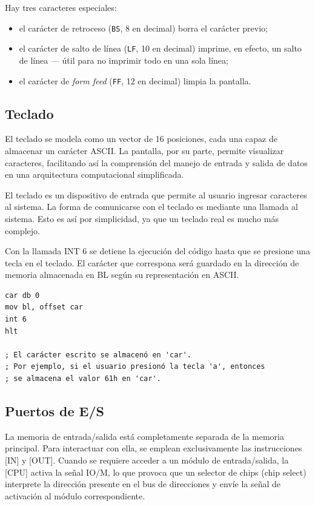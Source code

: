 \documentclass[12pt,oneside]{templates/unerthesis}
\providecommand{\tightlist}{%
  \setlength{\itemsep}{0pt}\setlength{\parskip}{0pt}}
\begin{document}
Hay tres caracteres especiales:

\begin{itemize}
\tightlist
\item
  el carácter de retroceso (\texttt{BS}, 8 en decimal) borra el carácter previo;
\item
  el carácter de salto de línea (\texttt{LF}, 10 en decimal) imprime, en efecto, un salto de línea --- útil para no imprimir todo en una sola línea;
\item
  el carácter de \emph{form feed} (\texttt{FF}, 12 en decimal) limpia la pantalla.
\end{itemize}

\hypertarget{teclado}{%
\subsection{Teclado}\label{teclado}}

El teclado se modela como un vector de 16 posiciones, cada una capaz de almacenar un carácter ASCII. La pantalla, por su parte, permite visualizar caracteres, facilitando así la comprensión del manejo de entrada y salida de datos en una arquitectura computacional simplificada.

El teclado es un dispositivo de entrada que permite al usuario ingresar caracteres al sistema. La forma de comunicarse con el teclado es mediante una llamada al sistema. Esto es así por simplicidad, ya que un teclado real es mucho más complejo.

Con la llamada INT 6 se detiene la ejecución del código hasta que se presione una tecla en el teclado. El carácter que correspona será guardado en la dirección de memoria almacenada en BL según su representación en ASCII.

\begin{lstlisting}
car db 0
mov bl, offset car
int 6
hlt

; El carácter escrito se almacenó en 'car'.
; Por ejemplo, si el usuario presionó la tecla 'a', entonces
; se almacena el valor 61h en 'car'.\end{lstlisting}

\hypertarget{puertos-de-es}{%
\subsection{Puertos de E/S}\label{puertos-de-es}}

La memoria de entrada/salida está completamente separada de la memoria principal. Para interactuar con ella, se emplean exclusivamente las instrucciones {[}IN{]} y {[}OUT{]}. Cuando se requiere acceder a un módulo de entrada/salida, la {[}CPU{]} activa la señal IO/M, lo que provoca que un selector de chips (chip select) interprete la dirección presente en el bus de direcciones y envíe la señal de activación al módulo correspondiente.
\end{document}
